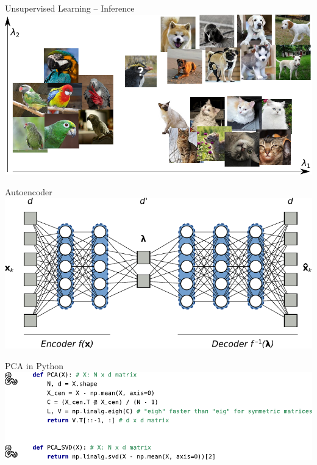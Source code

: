 \documentclass[handout,aspectratio=169]{beamer}
\begin{document}
	\begin{frame}{Unsupervised Learning -- Inference}
		\centering
		\includegraphics[scale=0.95]{media/learning_example_unsupervised_3.pdf}
	\end{frame}

	\begin{frame}{Autoencoder}
		\centering
		\includegraphics[width=\textwidth]{media/autoencoder.pdf}
	\end{frame}


	\begin{frame}{PCA in Python}
		\centering
		\includegraphics[width=\textwidth]{media/pca_code.pdf}
	\end{frame}
\end{document}
